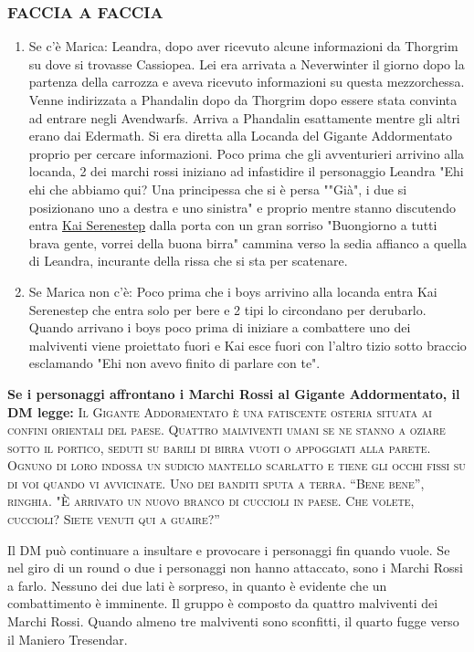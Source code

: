 \documentclass{article}
\begin{document}
\subsubsection{FACCIA A FACCIA}
\hypertarget{faccia}{}
\begin{enumerate}
    \item Se c'è Marica: Leandra, dopo aver ricevuto alcune informazioni da Thorgrim su dove si trovasse Cassiopea. Lei era arrivata a Neverwinter il giorno dopo la partenza della carrozza e aveva ricevuto informazioni su questa mezzorchessa. Venne indirizzata a Phandalin dopo da Thorgrim dopo essere  stata convinta ad entrare negli Avendwarfs. Arriva a Phandalin esattamente mentre gli altri erano dai Edermath. Si era diretta alla Locanda del Gigante Addormentato proprio per cercare informazioni. Poco prima che gli avventurieri arrivino alla locanda, 2 dei marchi rossi iniziano ad infastidire il personaggio Leandra "Ehi ehi che abbiamo qui? Una principessa che si è persa ""Già", i due si posizionano uno a destra e uno sinistra" e proprio mentre stanno discutendo entra \hyperlink{kai}{Kai Serenestep} dalla porta con un gran sorriso "Buongiorno a tutti brava gente, vorrei della buona birra" cammina verso la sedia affianco a quella di Leandra, incurante della rissa che si sta per scatenare.
    \item Se Marica non c'è: Poco prima che i boys arrivino alla locanda entra Kai Serenestep che entra solo per bere e 2 tipi lo circondano per derubarlo. Quando arrivano i boys poco prima di iniziare a combattere uno dei malviventi viene proiettato fuori e Kai esce fuori con l'altro tizio sotto braccio esclamando "Ehi non avevo finito di parlare con te". 
\end{enumerate}
\textbf{Se i personaggi affrontano i Marchi Rossi al Gigante
Addormentato, il DM legge:}
\textsc{Il Gigante Addormentato è una fatiscente osteria situata ai
confini orientali del paese. Quattro malviventi umani se ne
stanno a oziare sotto il portico, seduti su barili di birra vuoti
o appoggiati alla parete. Ognuno di loro indossa un sudicio
mantello scarlatto e tiene gli occhi fissi su di voi quando vi
avvicinate. Uno dei banditi sputa a terra. “Bene bene”, ringhia.
"È arrivato un nuovo branco di cuccioli in paese. Che volete,
cuccioli? Siete venuti qui a guaire?”}
  \newline
  
Il DM può continuare a insultare e provocare i personaggi
fin quando vuole. Se nel giro di un round o due i personaggi
non hanno attaccato, sono i Marchi Rossi a farlo. Nessuno
dei due lati è sorpreso, in quanto è evidente che un
combattimento è imminente.
Il gruppo è composto da quattro malviventi dei Marchi
Rossi. Quando almeno tre malviventi sono sconfitti, il quarto
fugge verso il Maniero Tresendar.
\end{document}
